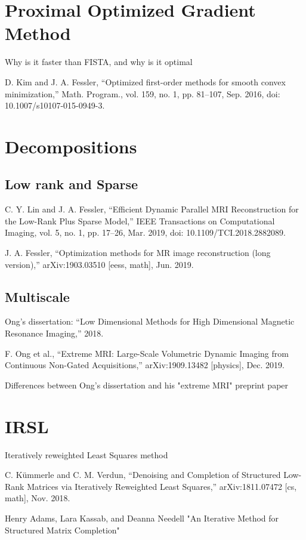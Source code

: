 \fi

\section{Proximal Optimized Gradient Method}
Why is it faster than FISTA, and why is it optimal

D. Kim and J. A. Fessler, “Optimized first-order methods for smooth convex minimization,” Math. Program., vol. 159, no. 1, pp. 81–107, Sep. 2016, doi: 10.1007/s10107-015-0949-3.

\section{Decompositions}

\subsection{Low rank and Sparse}
C. Y. Lin and J. A. Fessler, “Efficient Dynamic Parallel MRI Reconstruction for the Low-Rank Plus Sparse Model,” IEEE Transactions on Computational Imaging, vol. 5, no. 1, pp. 17–26, Mar. 2019, doi: 10.1109/TCI.2018.2882089.

J. A. Fessler, “Optimization methods for MR image reconstruction (long version),” arXiv:1903.03510 [eess, math], Jun. 2019.

\subsection{Multiscale}

Ong's dissertation: “Low Dimensional Methods for High Dimensional Magnetic Resonance Imaging,” 2018.

F. Ong et al., “Extreme MRI: Large-Scale Volumetric Dynamic Imaging from Continuous Non-Gated Acquisitions,” arXiv:1909.13482 [physics], Dec. 2019.

Differences between Ong's dissertation and his "extreme MRI" preprint paper

\section{IRSL}
Iteratively reweighted Least Squares method

C. Kümmerle and C. M. Verdun, “Denoising and Completion of Structured Low-Rank Matrices via Iteratively Reweighted Least Squares,” arXiv:1811.07472 [cs, math], Nov. 2018.

Henry Adams, Lara Kassab, and Deanna Needell "An Iterative Method for Structured Matrix Completion"

\clearpage %